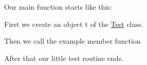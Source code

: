  Our main function starts like this\+: 
\begin{DoxyCodeInclude}

\end{DoxyCodeInclude}
 First we create an object {\ttfamily t} of the \hyperlink{class_test}{Test} class. 
\begin{DoxyCodeInclude}

\end{DoxyCodeInclude}
 Then we call the example member function 
\begin{DoxyCodeInclude}

\end{DoxyCodeInclude}
 After that our little test routine ends. 
\begin{DoxyCodeInclude}

\end{DoxyCodeInclude}
 